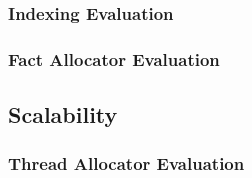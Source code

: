 \subsubsection{Indexing Evaluation}

\subsubsection{Fact Allocator Evaluation}

\subsection{Scalability}

\subsubsection{Thread Allocator Evaluation}

